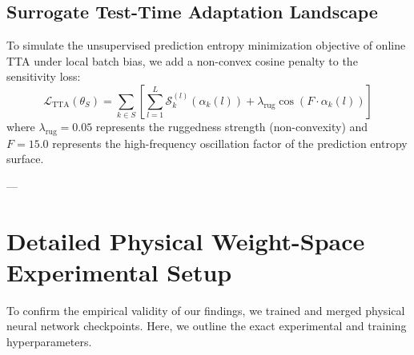 \subsection{Surrogate Test-Time Adaptation Landscape}
To simulate the unsupervised prediction entropy minimization objective of online TTA under local batch bias, we add a non-convex cosine penalty to the sensitivity loss:
\begin{equation}
\mathcal{L}_{\text{TTA}}(\theta_S) = \sum_{k \in S} \left[ \sum_{l=1}^L \mathcal{S}_k^{(l)}(\alpha_k(l)) + \lambda_{\text{rug}} \cos(F \cdot \alpha_k(l)) \right]
\end{equation}
where $\lambda_{\text{rug}} = 0.05$ represents the ruggedness strength (non-convexity) and $F = 15.0$ represents the high-frequency oscillation factor of the prediction entropy surface.

---

\section{Detailed Physical Weight-Space Experimental Setup}
\label{app:physical_setup}

To confirm the empirical validity of our findings, we trained and merged physical neural network checkpoints.
Here, we outline the exact experimental and training hyperparameters.

